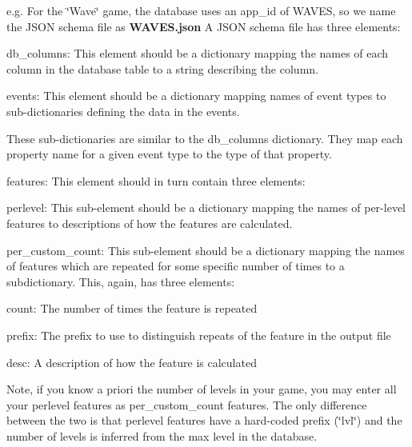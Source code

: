 e.\+g. For the \char`\"{}\+Wave\char`\"{} game, the database uses an app\+\_\+id of {\ttfamily W\+A\+V\+ES}, so we name the J\+S\+ON schema file as {\bfseries{W\+A\+V\+E\+S.\+json}} A J\+S\+ON schema file has three elements\+:
\begin{DoxyItemize}
\item {\ttfamily db\+\_\+columns}\+: This element should be a dictionary mapping the names of each column in the database table to a string describing the column.
\item {\ttfamily events}\+: This element should be a dictionary mapping names of event types to sub-\/dictionaries defining the data in the events.
\begin{DoxyItemize}
\item These sub-\/dictionaries are similar to the db\+\_\+columns dictionary. They map each property name for a given event type to the type of that property.
\end{DoxyItemize}
\item {\ttfamily features}\+: This element should in turn contain three elements\+:
\begin{DoxyItemize}
\item {\ttfamily perlevel}\+: This sub-\/element should be a dictionary mapping the names of per-\/level features to descriptions of how the features are calculated.
\item {\ttfamily per\+\_\+custom\+\_\+count}\+: This sub-\/element should be a dictionary mapping the names of features which are repeated for some specific number of times to a subdictionary. This, again, has three elements\+:
\begin{DoxyItemize}
\item {\ttfamily count}\+: The number of times the feature is repeated
\item {\ttfamily prefix}\+: The prefix to use to distinguish repeats of the feature in the output file
\item {\ttfamily desc}\+: A description of how the feature is calculated
\end{DoxyItemize}

Note, if you know a priori the number of levels in your game, you may enter all your {\ttfamily perlevel} features as {\ttfamily per\+\_\+custom\+\_\+count} features. The only difference between the two is that {\ttfamily perlevel} features have a hard-\/coded prefix (\char`\"{}lvl\char`\"{}) and the number of levels is inferred from the max level in the database.
\end{DoxyItemize}
\end{DoxyItemize}

